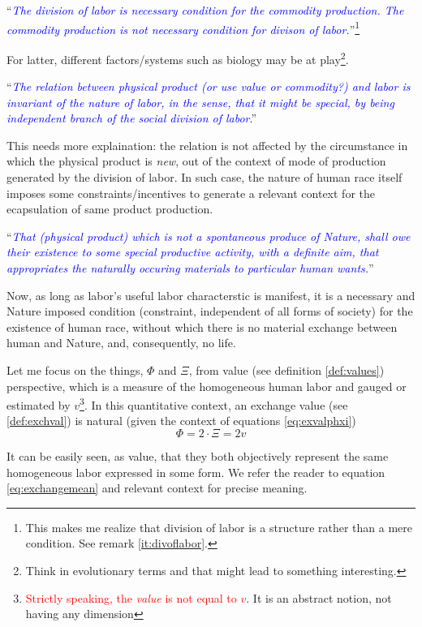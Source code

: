 \documentclass[12pt]{extarticle}
\theoremstyle{definition}
\begin{document}
``\emph{\textcolor{blue}{The division of labor is necessary condition for the commodity production.  The commodity production is not necessary condition for divison of labor.}}''\footnote{This makes me realize that division of labor is a structure rather than a mere condition.  See remark \ref{it:divoflabor}.}

For latter, different factors/systems such as biology may be at play\footnote{Think in evolutionary terms and that might lead to something interesting.}.

``\emph{\textcolor{blue}{The relation between physical product (or use value or commodity?) and labor is invariant of the nature of labor, in the sense, that it might be special, by being independent branch of the social division of labor}}.''

This needs more explaination: the relation is not affected by the circumstance in which the physical product is \emph{new}, out of the context of mode of production generated by the division of labor.  In such case, the nature of human race itself imposes some constraints/incentives to generate a relevant context for the ecapsulation of same product production.

``\emph{\textcolor{blue}{That (physical product) which is not a spontaneous produce of Nature, shall owe their existence to some special productive activity, with a definite aim, that appropriates the naturally occuring materials to particular human wants.}}''

Now, as long as labor's useful labor characterstic is manifest, it is a necessary and Nature imposed condition (constraint, independent of all forms of society) for the existence of human race, without which there is no material exchange between human and Nature, and, consequently, no life.

Let me focus on the things, $\Phi$ and $\Xi$, from value (see definition \ref{def:values}) perspective, which is a measure of the homogeneous human labor and gauged or estimated by $v$\footnote{\textcolor{red}{Strictly speaking, the \emph{value} is not equal to $v$}.  It is an abstract notion, not having any dimension}.  In this quantitative context, an exchange value (see \ref{def:exchval}) is natural (given the context of equations \ref{eq:exvalphxi})
\begin{equation}
  \label{eq:exchange}
  \Phi = 2\cdot\Xi = 2v
\end{equation}

It can be easily seen, as value, that they both objectively represent the same homogeneous labor expressed in some form.  We refer the reader to equation \ref{eq:exchangemean} and relevant context for precise meaning.
\end{document}
